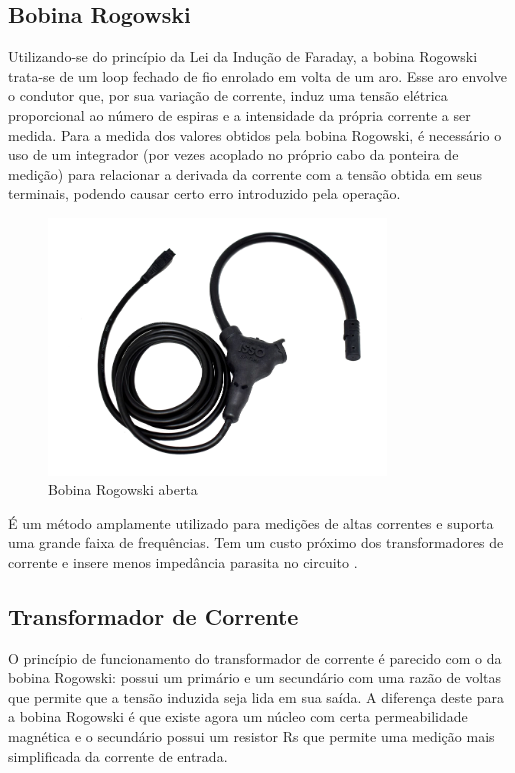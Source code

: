 \subsection{Bobina Rogowski}\label{subsec:Rogowski}

Utilizando-se do princípio da Lei da Indução de Faraday, a bobina Rogowski trata-se de um loop fechado de fio enrolado em volta de um aro. Esse aro envolve o condutor que, por sua variação de corrente, induz uma tensão elétrica proporcional ao número de espiras e a intensidade da própria corrente a ser medida. Para a medida dos valores obtidos pela bobina Rogowski, é necessário o uso de um integrador (por vezes acoplado no próprio cabo da ponteira de medição) para relacionar a derivada da corrente com a tensão obtida em seus terminais, podendo causar certo erro introduzido pela operação.

\begin{figure}[htb!]
    \caption{Bobina Rogowski aberta}
    \label{fig:rogowski-bobina}
    \includegraphics[width=0.8\textwidth]{figuras/bobina-rogowski.png}
\end{figure}

É um método amplamente utilizado para medições de altas correntes e suporta uma grande faixa de frequências. Tem um custo próximo dos transformadores de corrente e insere menos impedância parasita no circuito \citep{curr_sens_tech}.

\subsection{Transformador de Corrente}\label{subsec:t-corrente}

O princípio de funcionamento do transformador de corrente é parecido com o da bobina Rogowski: possui um primário e um secundário com uma razão de voltas que permite que a tensão induzida seja lida em sua saída. A diferença deste para a bobina Rogowski é que existe agora um núcleo com certa permeabilidade magnética e o secundário possui um resistor Rs que permite uma medição mais simplificada da corrente de entrada.

